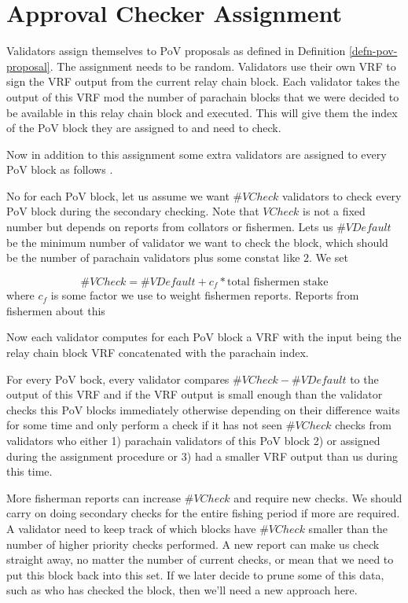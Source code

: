 \section{Approval Checker Assignment}
\label{sect-shot-assignment}

Validators assign themselves to PoV proposals as defined in Definition \ref{defn-pov-proposal}. The assignment needs to be random. Validators use their own VRF to sign the VRF output from the current relay chain block. Each validator takes the output of this VRF mod the number of parachain blocks that we were decided to be available in this relay chain block and executed. This will give them the index of the PoV block they are assigned to and need to check.

Now in addition to this assignment some extra validators are assigned to every PoV block as follows .

No for each PoV block, let us assume we want $\#VCheck$ validators to check every PoV block during the secondary checking. Note that $VCheck$ is not a fixed number but depends on reports from collators or fishermen. Lets us $\#VDefault$ be the minimum number of validator we want to check the block, which should be the number of parachain validators plus some constat like $2$.  We set

$$\#VCheck = \#VDefault + c_f * \textrm{total fishermen stake}$$
where $c_f$ is some factor we use to weight fishermen reports. Reports from fishermen about this 

Now each validator computes for each PoV block a VRF with the input being the relay chain block VRF concatenated with the parachain index. 

For every PoV bock, every validator compares $\#VCheck - \#VDefault$ to the output of this VRF and if the VRF output is small enough than the validator checks this PoV blocks immediately otherwise depending on their difference waits for some time and only perform a check if it has not seen $\#VCheck$ checks from validators who either 1) parachain validators of this PoV block 2) or assigned during the assignment procedure or 3) had a smaller VRF output than us during this time.

More fisherman reports can increase $\#VCheck$ and require new checks. We should carry on doing secondary checks for the entire fishing period if more are required. A validator need to keep track of which blocks have $\#VCheck$ smaller than the number of higher priority checks performed. A new report can make us check straight away, no matter the number of current checks, or mean that we need to put this block back into this set. If we later decide to prune some of this data, such as who has checked the block, then we'll need a new approach here.


